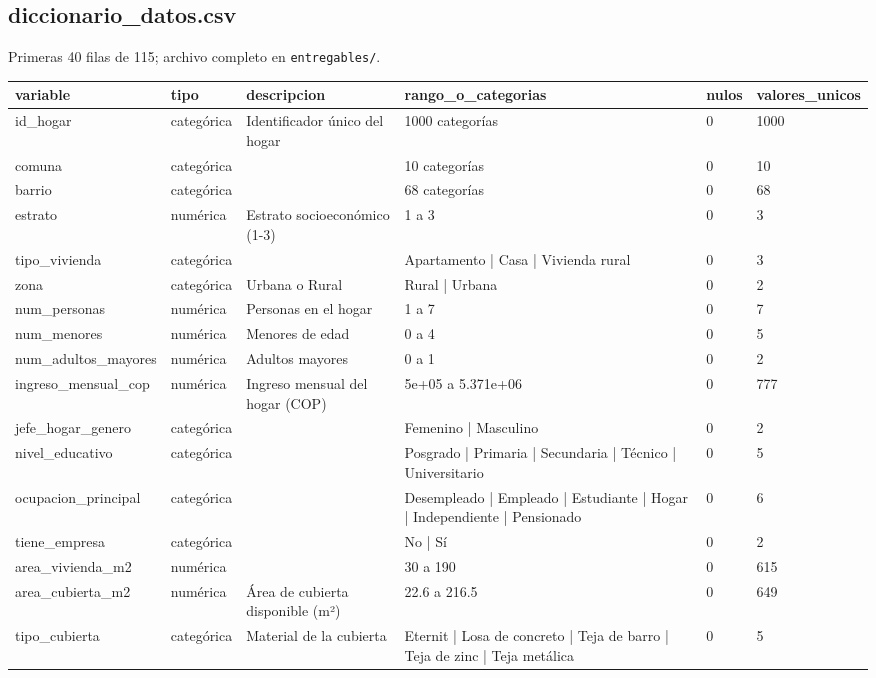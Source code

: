 \subsection*{diccionario\_datos.csv}
{\footnotesize Primeras 40 filas de 115; archivo completo en \texttt{entregables/}.}\\
{\footnotesize\begin{longtable}{@{}p{}lp{}p{}ll@{}}
\toprule
variable & tipo & descripcion & rango\_o\_categorias & nulos & valores\_unicos \\
\midrule\endhead
id\_hogar & categórica & Identificador único del hogar & 1000 categorías & 0 & 1000 \\
comuna & categórica &  & 10 categorías & 0 & 10 \\
barrio & categórica &  & 68 categorías & 0 & 68 \\
estrato & numérica & Estrato socioeconómico (1-3) & 1 a 3 & 0 & 3 \\
tipo\_vivienda & categórica &  & Apartamento | Casa | Vivienda rural & 0 & 3 \\
zona & categórica & Urbana o Rural & Rural | Urbana & 0 & 2 \\
num\_personas & numérica & Personas en el hogar & 1 a 7 & 0 & 7 \\
num\_menores & numérica & Menores de edad & 0 a 4 & 0 & 5 \\
num\_adultos\_mayores & numérica & Adultos mayores & 0 a 1 & 0 & 2 \\
ingreso\_mensual\_cop & numérica & Ingreso mensual del hogar (COP) & 5e+05 a 5.371e+06 & 0 & 777 \\
jefe\_hogar\_genero & categórica &  & Femenino | Masculino & 0 & 2 \\
nivel\_educativo & categórica &  & Posgrado | Primaria | Secundaria | Técnico | Universitario & 0 & 5 \\
ocupacion\_principal & categórica &  & Desempleado | Empleado | Estudiante | Hogar | Independiente | Pensionado & 0 & 6 \\
tiene\_empresa & categórica &  & No | Sí & 0 & 2 \\
area\_vivienda\_m2 & numérica &  & 30 a 190 & 0 & 615 \\
area\_cubierta\_m2 & numérica & Área de cubierta disponible (m²) & 22.6 a 216.5 & 0 & 649 \\
tipo\_cubierta & categórica & Material de la cubierta & Eternit | Losa de concreto | Teja de barro | Teja de zinc | Teja metálica & 0 & 5 \\

\end{longtable}}
